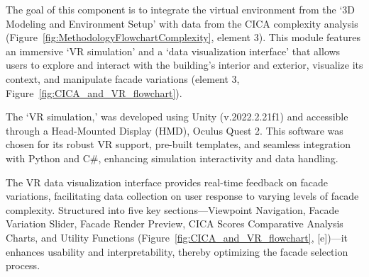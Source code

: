 %


The goal of this component is to integrate the virtual environment from the `3D Modeling and Environment Setup' with data from the CICA complexity analysis (Figure~\ref{fig:MethodologyFlowchartComplexity}, element 3).
This module features an immersive `VR simulation' and a `data visualization interface' that allows users to explore and interact with the building's interior and exterior, visualize its context, and manipulate facade variations (element 3, Figure~\ref{fig:CICA_and_VR_flowchart}).

The `VR simulation,' was developed using Unity (v.2022.2.21f1) and accessible through a Head-Mounted Display (HMD), Oculus Quest 2.
This software was chosen for its robust VR support, pre-built templates, and seamless integration with Python and C\#, enhancing simulation interactivity and data handling.

The VR data visualization interface provides real-time feedback on facade variations, facilitating data collection on user response to varying levels of facade complexity.
Structured into five key sections—Viewpoint Navigation, Facade Variation Slider, Facade Render Preview, CICA Scores Comparative Analysis Charts, and Utility Functions (Figure~\ref{fig:CICA_and_VR_flowchart}, [e])—it enhances usability and interpretability, thereby optimizing the facade selection process.





